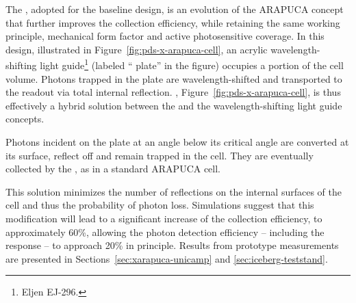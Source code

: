 The , adopted for the baseline design, is an evolution of the ARAPUCA concept that further improves the collection efficiency, while retaining the same working principle, mechanical form factor and active photosensitive coverage. 
In this design, illustrated in  Figure~\ref{fig:pds-x-arapuca-cell}, an %
acrylic wavelength-shifting light guide\footnote{Eljen EJ-296\texttrademark{}.} (labeled `` plate'' in the figure) occupies a portion of the cell volume. Photons trapped in the plate are %
wavelength-shifted and transported to the readout via total internal reflection. 
, Figure~\ref{fig:pds-x-arapuca-cell},  is thus effectively a hybrid solution between the  and the wavelength-shifting light guide concepts. 

Photons incident on the plate at an angle below its critical angle %
 are converted at its surface, reflect off and
 remain trapped in the cell. They are eventually collected by the , as in a standard ARAPUCA cell.
 
This solution minimizes the number of reflections on the internal surfaces of the cell and thus the probability of photon loss. Simulations suggest that this modification will lead to a significant increase of the collection efficiency, to approximately 60\%, allowing the photon detection efficiency -- including the  response -- to approach 20\% in principle.  Results from prototype measurements are presented in Sections~\ref{sec:xarapuca-unicamp} and \ref{sec:iceberg-teststand}.

